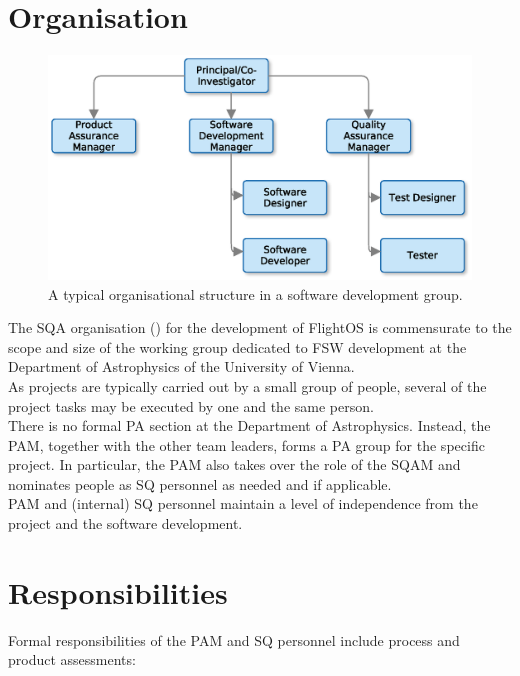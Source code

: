 \section{Organisation}

\begin{figure}[htb]
\begin{center}
	\includegraphics[width=0.7\columnwidth]{images/software_dev_structure}
	\caption{A typical organisational structure in a software development
		 group.}
	\label{fig:sw_dev_org}
\end{center}
\end{figure}

\noindent
The \gls{SQA} organisation () for the development of FlightOS
is commensurate to the scope and size of the working group dedicated to
\gls{FSW} development at the Department of Astrophysics of the University of
Vienna.\\

\noindent
As projects are typically carried out by a small group of people, several of
the project tasks may be executed by one and the same person.\\

\noindent
There is no formal \gls{PA} section at the Department of Astrophysics.
Instead, the \gls{PAM}, together with the other team leaders, forms a \gls{PA}
group for the specific project. In particular, the \gls{PAM} also takes over the
role of the \gls{SQAM} and nominates people as \gls{SQ} personnel as needed
and if applicable.\\

\noindent
\gls{PAM} and (internal) \gls{SQ} personnel maintain a level of independence
from the project and the software development.



\section{Responsibilities}

Formal responsibilities of the \gls{PAM} and \gls{SQ} personnel include process
and product assessments:

